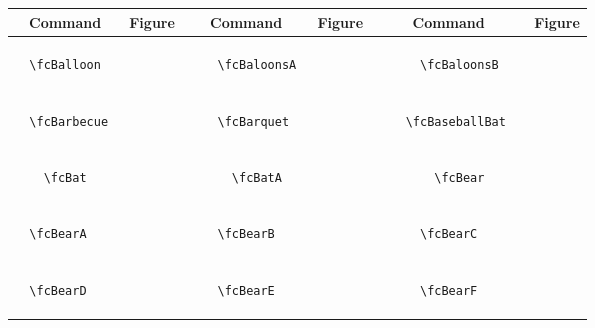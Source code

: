 \documentclass[x11names]{article}
\begin{document}
\begin{table}[H]\centering\begin{tabular}{|c|c|c|c|c|c|}\hline{\bf Command} & {\bf Figure} & {\bf Command} & {\bf Figure} & {\bf Command} & {\bf Figure}\\	\hline	&\multirow{5}{*}{	\fcBalloon	[scale=0.4]} & &\multirow{5}{*}{	\fcBaloonsA	[scale=0.4]} & &\multirow{5}{*}{	\fcBaloonsB	[scale=0.4]}\\	& & & & & \\	& & & & & \\	\verb|	\fcBalloon	| & & \verb|	\fcBaloonsA	| & & \verb|	\fcBaloonsB	| & \\	& & & & & \\	& & & & & \\	& & & & & \\	\hline									
		&\multirow{5}{*}{	\fcBarbecue	[scale=0.4]} & &\multirow{5}{*}{	\fcBarquet	[scale=0.4]} & &\multirow{5}{*}{	\fcBaseballBat	[scale=0.8]}\\	& & & & & \\	& & & & & \\	\verb|	\fcBarbecue	| & & \verb|	\fcBarquet	| & & \verb|	\fcBaseballBat	| & \\	& & & & & \\	& & & & & \\	& & & & & \\	\hline									
		&\multirow{5}{*}{	\fcBat	[scale=0.8]} & &\multirow{5}{*}{	\fcBatA	[scale=0.8]} & &\multirow{5}{*}{	\fcBear	[scale=0.8]}\\	& & & & & \\	& & & & & \\	\verb|	\fcBat	| & & \verb|	\fcBatA	| & & \verb|	\fcBear	| & \\	& & & & & \\	& & & & & \\	& & & & & \\	\hline									
		&\multirow{5}{*}{	\fcBearA	[scale=0.4]} & &\multirow{5}{*}{	\fcBearB	[scale=0.4]} & &\multirow{5}{*}{	\fcBearC	[scale=0.4]}\\	& & & & & \\	& & & & & \\	\verb|	\fcBearA	| & & \verb|	\fcBearB	| & & \verb|	\fcBearC	| & \\	& & & & & \\	& & & & & \\	& & & & & \\	\hline									
		&\multirow{5}{*}{	\fcBearD	[scale=0.4]} & &\multirow{5}{*}{	\fcBearE	[scale=0.4]} & &\multirow{5}{*}{	\fcBearF	[scale=0.4]}\\	& & & & & \\	& & & & & \\	\verb|	\fcBearD	| & & \verb|	\fcBearE	| & & \verb|	\fcBearF	| & \\	& & & & & \\	& & & & & \\	& & & & & \\	\hline									

\end{tabular}
\end{table}
\end{document}
